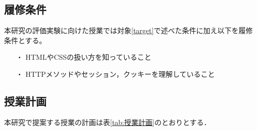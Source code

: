 \subsection{履修条件}

本研究の評価実験に向けた授業では対象\ref{target}で述べた条件に加え以下を履修条件とする。

\begin{itemize}
 \item[・] HTMLやCSSの扱い方を知っていること
 \item[・] HTTPメソッドやセッション，クッキーを理解していること
\end{itemize}

\subsection{授業計画}

本研究で提案する授業の計画は表\ref{tab:授業計画}のとおりとする．

